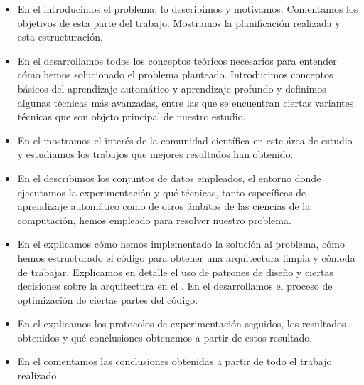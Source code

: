 \begin{itemize}
	\item En el  introducimos el problema, lo describimos y motivamos. Comentamos los objetivos de esta parte del trabajo. Mostramos la planificación realizada y esta estructuración.
	\item En el  desarrollamos todos los conceptos teóricos necesarios para entender cómo hemos solucionado el problema planteado. Introducimos conceptos básicos del aprendizaje automático y aprendizaje profundo y definimos algunas técnicas más avanzadas, entre las que se encuentran ciertas variantes técnicas que son objeto principal de nuestro estudio.
	\item En el  mostramos el interés de la comunidad científica en este área de estudio y estudiamos los trabajos que mejores resultados han obtenido.
	\item En el  describimos los conjuntos de datos empleados, el entorno donde ejecutamos la experimentación y qué técnicas, tanto específicas de aprendizaje automático como de otros ámbitos de las ciencias de la computación, hemos empleado para resolver nuestro problema.
	\item En el  explicamos cómo hemos implementado la solución al problema, cómo hemos estructurado el código para obtener una arquitectura limpia y cómoda de trabajar. Explicamos en detalle el uso de patrones de diseño y ciertas decisiones sobre la arquitectura en el . En el  desarrollamos el proceso de optimización de ciertas partes del código.
	\item En el  explicamos los protocolos de experimentación seguidos, los resultados obtenidos y qué conclusiones obtenemos a partir de estos resultado.
	\item En el  comentamos las conclusiones obtenidas a partir de todo el trabajo realizado.

\end{itemize}
